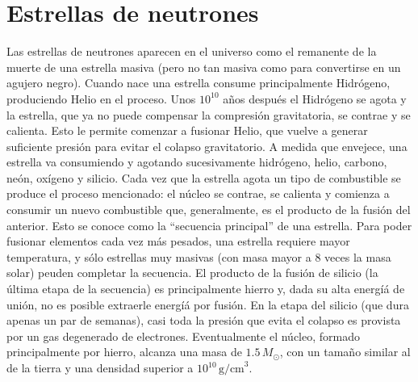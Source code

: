 \section{Estrellas de neutrones}\label{sc:intro}

Las estrellas de neutrones aparecen en el universo como el remanente de la muerte de una estrella masiva (pero no tan masiva como para convertirse en un agujero negro).
Cuando nace una estrella consume principalmente Hidrógeno, produciendo Helio en el proceso.
Unos $10^{10}$ años después el Hidrógeno se agota y la estrella, que ya no puede compensar la compresión gravitatoria, se contrae y se calienta.
Esto le permite comenzar a fusionar Helio, que vuelve a generar suficiente presión para evitar el colapso gravitatorio.
A medida que envejece, una estrella va consumiendo y agotando sucesivamente hidrógeno, helio, carbono, neón, oxígeno y silicio.
Cada vez que la estrella agota un tipo de combustible se produce el proceso mencionado: el núcleo se contrae, se calienta y comienza a consumir un nuevo combustible que, generalmente, es el producto de la fusión del anterior.
Esto se conoce como la ``secuencia principal'' de una estrella.
Para poder fusionar elementos cada vez más pesados, una estrella requiere mayor temperatura, y sólo estrellas muy masivas (con masa mayor a 8 veces la masa solar) peuden completar la secuencia.
El producto de la fusión de silicio (la última etapa de la secuencia) es principalmente hierro y, dada su alta energíá de unión, no es posible extraerle energíá por fusión.
En la etapa del silicio (que dura apenas un par de semanas), casi toda la presión que evita el colapso es provista por un gas degenerado de electrones.
Eventualmente el núcleo, formado principalmente por hierro, alcanza una masa de $1.5\,M_\odot$, con un tamaño similar al de la tierra y una densidad superior a $10^{10}\,\text{g/cm}^{3}$.

